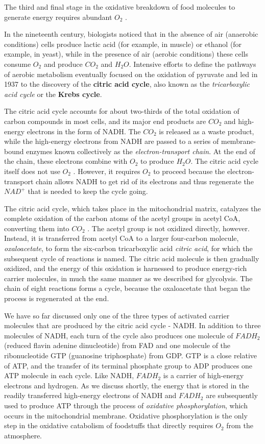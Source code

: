 The third and final stage in the oxidative breakdown of food molecules
to generate energy requires abundant $O_2$ .

In the nineteenth century, biologists noticed that in the absence of air
(anaerobic conditions) cells produce lactic acid (for example, in muscle)
or ethanol (for example, in yeast), while in the presence of air (aerobic
conditions) these cells consume $O_2$ and produce $CO_2$ and $H_{2}O$. Intensive
efforts to define the pathways of aerobic metabolism eventually focused
on the oxidation of pyruvate and led in 1937 to the discovery of the \textbf{citric
acid cycle}, also known as the \textit{tricarboxylic acid cycle} or the
\textbf{Krebs cycle}.

The citric acid cycle accounts for about
two-thirds of the total oxidation of carbon compounds in most cells, and
its major end products are $CO_2$ and high-energy electrons in the form of
NADH. The $CO_2$ is released as a waste product, while the high-energy
electrons from NADH are passed to a series of membrane-bound enzymes
known collectively as the \textit{electron-transport chain}. At the end of the chain,
these electrons combine with $O_2$ to produce $H_{2}O$. The citric acid cycle
itself does not use $O_2$ . However, it requires $O_2$ to proceed because the
electron-transport chain allows NADH to get rid of its electrons and thus
regenerate the $NAD^+$ that is needed to keep the cycle going.

The citric acid cycle, which takes place in the mitochondrial matrix, catalyzes
the complete oxidation of the carbon atoms of the acetyl groups in
acetyl CoA, converting them into $CO_2$ . The acetyl group is not oxidized
directly, however. Instead, it is transferred from acetyl CoA to a larger
four-carbon molecule, \textit{oxaloacetate}, to form the six-carbon tricarboxylic
acid \textit{citric acid}, for which the subsequent cycle of reactions is named.
The citric acid molecule is then gradually oxidized, and the energy of this
oxidation is harnessed to produce energy-rich carrier molecules, in much
the same manner as we described for glycolysis. The chain of eight reactions
forms a cycle, because the oxaloacetate that began the process is
regenerated at the end.

We have so far discussed only one of the three types of activated carrier
molecules that are produced by the citric acid cycle - NADH. In addition
to three molecules of NADH, each turn of the cycle also produces one
molecule of $FADH_2$ (reduced flavin adenine dinucleotide) from FAD and
one molecule of the ribonucleotide GTP (guanosine triphosphate) from
GDP. GTP is a close relative of ATP, and
the transfer of its terminal phosphate group to ADP produces one ATP
molecule in each cycle. Like NADH, $FADH_2$ is a carrier of high-energy
electrons and hydrogen. As we discuss shortly, the energy that is stored
in the readily transferred high-energy electrons of NADH and $FADH_2$ are
subsequently used to produce ATP through the process of \textit{oxidative phosphorylation},
which occurs in the mitochondrial membrane. Oxidative
phosphorylation is the only step in the oxidative catabolism of foodstuffs
that directly requires $O_2$ from the atmosphere.

